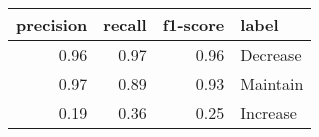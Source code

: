 
\begin{tabular}{rrrl}
\toprule
precision & recall & f1-score & label \\
\midrule
0.96 & 0.97 & 0.96 & Decrease \\
0.97 & 0.89 & 0.93 & Maintain \\
0.19 & 0.36 & 0.25 & Increase \\
\bottomrule
\end{tabular}
